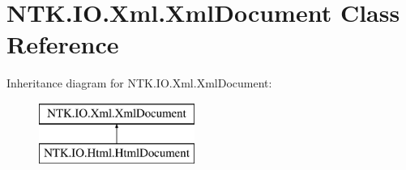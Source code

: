 \hypertarget{class_n_t_k_1_1_i_o_1_1_xml_1_1_xml_document}{}\section{N\+T\+K.\+I\+O.\+Xml.\+Xml\+Document Class Reference}
\label{class_n_t_k_1_1_i_o_1_1_xml_1_1_xml_document}


 


Inheritance diagram for N\+T\+K.\+I\+O.\+Xml.\+Xml\+Document\+:\begin{figure}[H]
\begin{center}
\leavevmode
\includegraphics[height=2.000000cm]{dd/dbf/class_n_t_k_1_1_i_o_1_1_xml_1_1_xml_document}
\end{center}
\end{figure}
